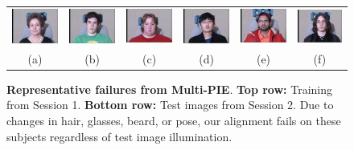 \begin{figure}
{\begin{tabular}{@{}c@{}c@{}c@{}c@{}c@{}c@{}}
\hspace{-2mm}\includegraphics[width=\tempwidth,clip=true]{figures_pami/multipie_failed/079_02_01_051_08.png}  &
\includegraphics[width=\tempwidth,clip=true]{figures_pami/multipie_failed/111_02_01_051_08.png}  &
\includegraphics[width=\tempwidth,clip=true]{figures_pami/multipie_failed/196_02_01_051_08.png}  &
\includegraphics[width=\tempwidth,clip=true]{figures_pami/multipie_failed/130_02_01_051_08.png}  &
\includegraphics[width=\tempwidth,clip=true]{figures_pami/multipie_failed/163_02_01_051_08.png}  &
\includegraphics[width=\tempwidth,clip=true]{figures_pami/multipie_failed/175_02_01_051_08.png} \\
\hspace{-2mm}(a) & (b) & (c) & (d) & (e) & (f) 
\end{tabular}
}
\caption{\small{\bf Representative failures from Multi-PIE}. {\bf Top row:} Training from Session 1. {\bf Bottom row:} Test images from Session 2. Due to changes in hair, glasses, beard, or pose, our alignment fails on these subjects regardless of test image illumination.}
\label{fig:failed-examples}
\end{figure}

